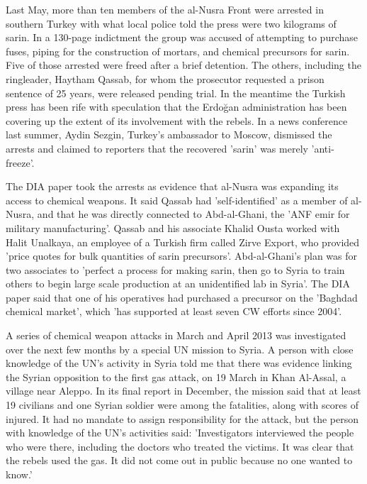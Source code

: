 Last May, more than ten members of the al-Nusra Front were arrested
in southern Turkey with what local police told the press were two
kilograms of sarin. In a 130-page indictment the group was accused
of attempting to purchase fuses, piping for the construction of mortars,
and chemical precursors for sarin. Five of those arrested were freed
after a brief detention. The others, including the ringleader, Haytham
Qassab, for whom the prosecutor requested a prison sentence of 25
years, were released pending trial. In the meantime the Turkish press
has been rife with speculation that the Erdo\u{g}an administration
has been covering up the extent of its involvement with the rebels.
In a news conference last summer, Aydin Sezgin, Turkey's ambassador
to Moscow, dismissed the arrests and claimed to reporters that the
recovered 'sarin' was merely 'anti-freeze'.

The DIA paper took the arrests as evidence that al-Nusra was expanding
its access to chemical weapons. It said Qassab had 'self-identified'
as a member of al-Nusra, and that he was directly connected to Abd-al-Ghani,
the 'ANF emir for military manufacturing'. Qassab and his associate
Khalid Ousta worked with Halit Unalkaya, an employee of a Turkish
firm called Zirve Export, who provided 'price quotes for bulk quantities
of sarin precursors'. Abd-al-Ghani's plan was for two associates to
'perfect a process for making sarin, then go to Syria to train others
to begin large scale production at an unidentified lab in Syria'.
The DIA paper said that one of his operatives had purchased a precursor
on the 'Baghdad chemical market', which 'has supported at least seven
CW efforts since 2004'.

A series of chemical weapon attacks in March and April 2013 was investigated
over the next few months by a special UN mission to Syria. A person
with close knowledge of the UN's activity in Syria told me that there
was evidence linking the Syrian opposition to the first gas attack,
on 19 March in Khan Al-Assal, a village near Aleppo. In its final
report in December, the mission said that at least 19 civilians and
one Syrian soldier were among the fatalities, along with scores of
injured. It had no mandate to assign responsibility for the attack,
but the person with knowledge of the UN's activities said: 'Investigators
interviewed the people who were there, including the doctors who treated
the victims. It was clear that the rebels used the gas. It did not
come out in public because no one wanted to know.'

